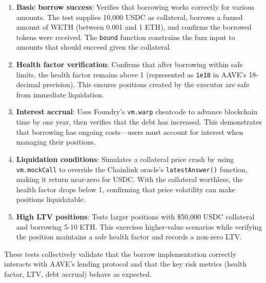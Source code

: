 \begin{enumerate}
    \item \textbf{Basic borrow success}: Verifies that borrowing works correctly for various amounts. The test supplies 10,000 USDC as collateral, borrows a fuzzed amount of WETH (between 0.001 and 1 ETH), and confirms the borrowed tokens were received. The \texttt{bound} function constrains the fuzz input to amounts that should succeed given the collateral.

    \item \textbf{Health factor verification}: Confirms that after borrowing within safe limits, the health factor remains above 1 (represented as \texttt{1e18} in AAVE's 18-decimal precision). This ensures positions created by the executor are safe from immediate liquidation.

    \item \textbf{Interest accrual}: Uses Foundry's \texttt{vm.warp} cheatcode to advance blockchain time by one year, then verifies that the debt has increased. This demonstrates that borrowing has ongoing costs---users must account for interest when managing their positions.

    \item \textbf{Liquidation conditions}: Simulates a collateral price crash by using \texttt{vm.mockCall} to override the Chainlink oracle's \texttt{latestAnswer()} function, making it return near-zero for USDC. With the collateral worthless, the health factor drops below 1, confirming that price volatility can make positions liquidatable.

    \item \textbf{High LTV positions}: Tests larger positions with \$50,000 USDC collateral and borrowing 5-10 ETH. This exercises higher-value scenarios while verifying the position maintains a safe health factor and records a non-zero LTV.
\end{enumerate}

These tests collectively validate that the borrow implementation correctly interacts with AAVE's lending protocol and that the key risk metrics (health factor, LTV, debt accrual) behave as expected.
